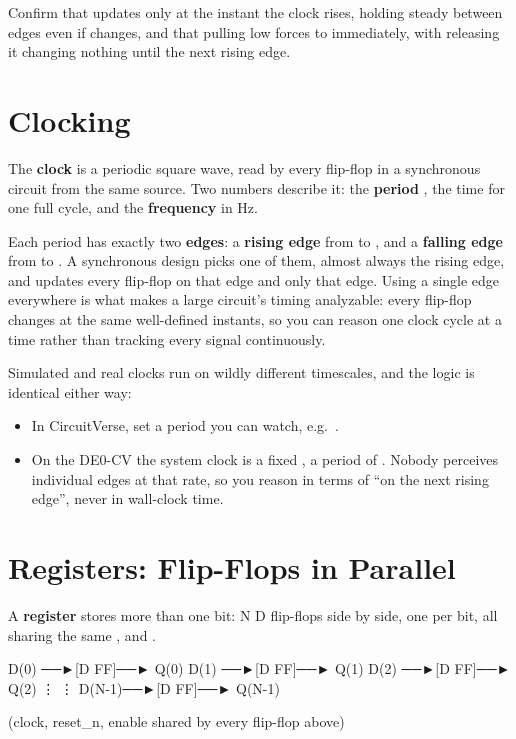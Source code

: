 Confirm that  updates only at the instant the clock rises, holding steady between edges even
if  changes, and that pulling  low forces  to  immediately,
with releasing it changing nothing until the next rising edge.

\section{Clocking}
\label{c3:a4}
The \textbf{clock} is a periodic square wave, read by every flip-flop in a synchronous circuit from
the same source. Two numbers describe it: the \textbf{period} , the time for one full cycle,
and the \textbf{frequency}  in Hz.

Each period has exactly two \textbf{edges}: a \textbf{rising edge} from  to , and a
\textbf{falling edge} from  to . A synchronous design picks one of them, almost
always the rising edge, and updates every flip-flop on that edge and only that edge. Using a single
edge everywhere is what makes a large circuit's timing analyzable: every flip-flop changes at the
same well-defined instants, so you can reason one clock cycle at a time rather than tracking every
signal continuously.

Simulated and real clocks run on wildly different timescales, and the logic is identical either way:
\begin{itemize}
  \item In CircuitVerse, set a period you can watch, e.g.\ .
  \item On the DE0-CV the system clock is a fixed , a period of . Nobody
    perceives individual edges at that rate, so you reason in terms of ``on the next rising edge'',
    never in wall-clock time.
\end{itemize}

\section{Registers: Flip-Flops in Parallel}
\label{c3:a5}
A \textbf{register} stores more than one bit: N D flip-flops side by side, one per bit, all sharing
the same ,  and .

\begin{textdrawing}
D(0) ──►[D FF]──► Q(0)
D(1) ──►[D FF]──► Q(1)
D(2) ──►[D FF]──► Q(2)
   ⋮        ⋮
D(N-1)──►[D FF]──► Q(N-1)

  (clock, reset_n, enable shared by every flip-flop above)
\end{textdrawing}


